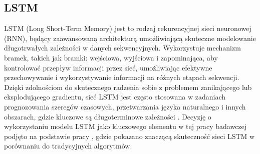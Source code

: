 \documentclass[polish, twoside, 12pt, a4paper]{article}
\theoremstyle{definition}
\theoremstyle{plain}
\theoremstyle{remark}
\begin{document}
\subsection{LSTM}

LSTM (Long Short-Term Memory) jest to rodzaj rekurencyjnej sieci neuronowej (RNN), będący zaawansowaną architekturą umożliwiającą skuteczne modelowanie długotrwałych zależności w danych sekwencyjnych. Wykorzystuje mechanizm bramek, takich jak bramki: wejściowa, wyjściowa i zapominająca, aby kontrolować przepływ informacji przez sieć, umożliwiając efektywne przechowywanie i wykorzystywanie informacji na różnych etapach sekwencji. Dzięki zdolnościom do skutecznego radzenia sobie z problemem zanikającego lub eksplodującego gradientu, sieć LSTM jest często stosowana w zadaniach prognozowania szeregów czasowych, przetwarzania języka naturalnego i innych obszarach, gdzie kluczowe są długoterminowe zależności \citep{geron2020}.  Decyzję o wykorzystaniu modelu LSTM jako kluczowego elementu w tej pracy badawczej podjęto na podstawie pracy \citep{siami-namini2018}, gdzie pokazano znaczącą skuteczność sieci LSTM w porównaniu do tradycyjnych algorytmów.
\end{document}
